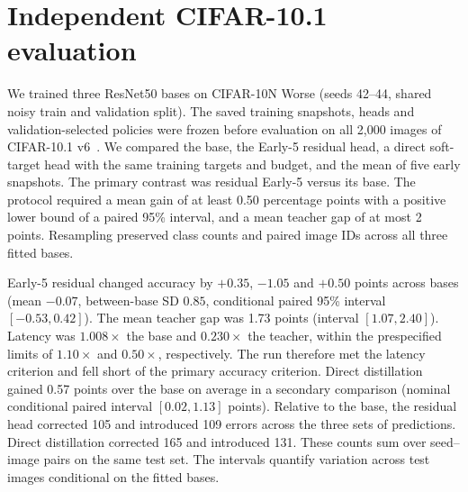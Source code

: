 \section{Independent CIFAR-10.1 evaluation}
\label{sec:confirmation-s4}
We trained three ResNet50 bases on CIFAR-10N Worse (seeds 42--44, shared
noisy train and validation split). The saved training snapshots, heads
and validation-selected policies were frozen before evaluation on all
2,000 images of CIFAR-10.1 v6~\citep{recht2019imagenet}. We compared the base, the Early-5 residual
head, a direct soft-target head with the same training targets and budget,
and the mean of five early snapshots. The primary contrast was residual
Early-5 versus its base. The protocol required a mean gain of at least
0.50 percentage points with a positive lower bound of a paired 95\%
interval, and a mean teacher gap of at most 2 points. Resampling preserved
class counts and paired image IDs across all three fitted bases.

\begin{table}[t]
\centering
\small
\caption{CIFAR-10.1 v6 test accuracy (\%) and T4 latency. Latency averages
per-seed medians at batch size one on noisy validation images, including
preprocessing of decoded inputs and transfer to the GPU.}
\label{tab:s4-confirmation}

\end{table}

Early-5 residual changed accuracy by $+0.35$, $-1.05$ and $+0.50$ points
across bases (mean $-0.07$, between-base SD $0.85$, conditional paired
95\% interval $[-0.53, 0.42]$). The mean teacher gap was 1.73 points
(interval $[1.07, 2.40]$). Latency was $1.008\times$ the base and
$0.230\times$ the teacher, within the prespecified limits of $1.10\times$
and $0.50\times$, respectively. The run therefore met the latency
criterion and fell short of the primary accuracy criterion. Direct
distillation gained 0.57 points over the base on average in a secondary
comparison (nominal conditional paired interval $[0.02, 1.13]$ points).
Relative to the base, the residual head corrected 105 and introduced 109 errors across the three sets of predictions. Direct distillation corrected 165 and introduced 131. These counts sum over seed--image pairs on the same test set.
The intervals quantify variation across test images
conditional on the fitted bases.
